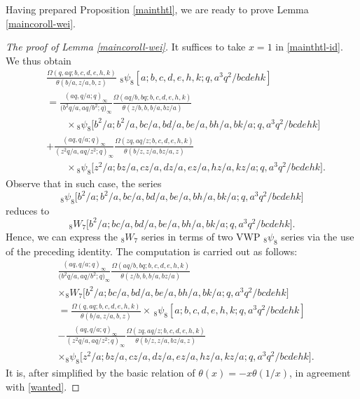 \documentclass[xits,review,sort&compress]{elsarticle}
\numberwithin{equation}{section}
\begin{document}
Having prepared  Proposition \ref{mainthtl}, we are ready to prove  Lemma  \ref{maincoroll-wei}.

\begin{proof}[The proof of Lemma  \ref{maincoroll-wei}]  It suffices to take $x=1$ in  \eqref{mainthtl-id}.
We thus obtain
\begin{align*}
&\frac{\Omega(q,aq;b,c,d,e,h,k)}
  {\theta(b /a,z/a,b,z)}\,\,{}_{8}\psi_{8}[a;b,c,d,e,h,k;q,a^3 q^2/bcdehk]\\
&=\frac{(a q,q/a;q)_{\infty}}{\big(b^2q/a,a q/b^2;q\big)_{\infty}}
  \frac{\Omega(aq/b,bq;b,c,d,e,h,k)}{\theta(z/b, b, b /a, bz/a)}\\
 &\qquad \times{}_{8}\psi_{8}\big[b^2 /a;b^2 /a,b c  /a,b d  /a,b e  /a,b h  /a,b k  /a;q,a^3 q^2/bcdehk\big]\nonumber\\
&+\frac{(a q,q/a;q)_{\infty}}{(z^2q/a,a q/z^2;q)_{\infty}}\frac{\Omega(zq,aq/z;b,c,d,e,h,k)}{\theta(b/z,  z/a,b z/a,  z)}\\
&\qquad\times{}_{8}\psi_{8}\big[z^2/a;b z/a, c  z/a,d  z/a,e  z/a,h z/a,k z/a;q,a^3 q^2/bcdehk\big].\nonumber
\end{align*}
Observe that in such case, the series
$$
{}_{8}\psi_{8}\big[b^2 /a;b^2 /a,b c  /a,b d  /a,b e  /a,b h  /a,b k  /a;q,a^3 q^2/bcdehk\big]
$$
reduces to
$$
{}_{8}W_{7}\big[b^2 /a;b c  /a,b d  /a,b e  /a,b h  /a,b k  /a;q,a^3 q^2/bcdehk\big].
$$
Hence, we can express  the ${}_{8}W_{7}$ series in terms of two VWP ${}_{8}\psi_{8}$ series via the use of the preceding identity. The computation  is carried out as follows:
\begin{align*}
&\frac{(a q,q/a;q)_{\infty}}{\big(b^2q/a,a q/b^2;q\big)_{\infty}}
  \frac{\Omega(aq/b,bq ;b,c,d,e,h,k)}{\theta(z/b, b, b /a, bz/a)}\\
  &\times{}_{8}W_{7}\big[b^2 /a;b c  /a,b d  /a,
  b e /a,b h  /a,b k  /a;q,a^3 q^2/bcdehk\big]\nonumber\\
&=\frac{\Omega(q,aq;b,c,d,e,h,k)}
  {\theta(b /a, z/a,b,z)}\times\,{}_{8}\psi_{8}[a;b,c,d,e,h,k;q,a^3 q^2/bcdehk]\\
&-\frac{(a q,q/a;q)_{\infty}}{(z^2q/a,a q/z^2;q)_{\infty}}\frac{\Omega(zq,aq/z;b,c,d,e,h,k)}{\theta(b/z, z/a,b z/a,  z)}\\
&\times{}_{8}\psi_{8}\big[z^2/a;b z/a, c  z/a,d  z/a,e  z/a,h z/a,k z/a;q,a^3 q^2/bcdehk\big].\nonumber
\end{align*}
It is, after  simplified by  the basic relation of
\(\theta(x)=-x\theta(1/x)\), in agreement with \eqref{wanted}.
\end{proof}
\end{document}
